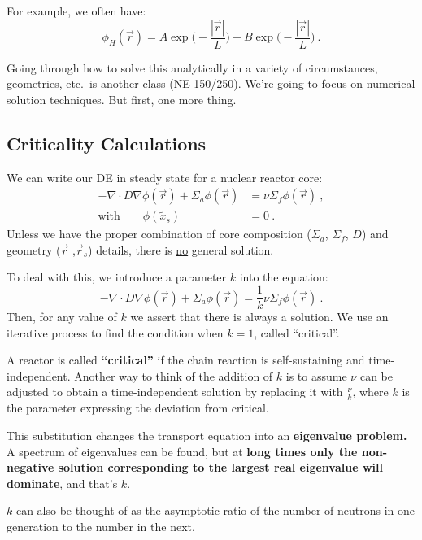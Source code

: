 \documentclass[12pt]{article}
\begin{document}
For example, we often have:
\[\phi_H(\vec{r}) = A\exp\bigl(-\frac{|\vec{r}|}{L}\bigr) + B\exp\bigl(-\frac{|\vec{r}|}{L}\bigr) \:.\]

Going through how to solve this analytically in a variety of circumstances, geometries, etc.\ is another class (NE 150/250). We're going to focus on numerical solution techniques. But first, one more thing.

\subsection*{Criticality Calculations}

We can write our DE in steady state for a nuclear reactor core:
%
\begin{align*}
-\nabla \cdot D\nabla \phi(\vec{r}) + 
\Sigma_a \phi(\vec{r}) &= \nu \Sigma_f \phi(\vec{r})\:, \\
\text{with} \qquad \phi(\tilde{x}_s) &= 0\:.
\end{align*}
%
Unless we have the proper combination of core composition ($\Sigma_a$, $\Sigma_f$, $D$) and geometry ($\vec{r}$ ,$\vec{r}_s$) details, there is \underline{no} general solution. 

To deal with this, we introduce a parameter $k$ into the equation:
%
\begin{equation}
-\nabla \cdot D\nabla \phi(\vec{r}) + 
\Sigma_a \phi(\vec{r}) = \frac{1}{k}\nu \Sigma_f \phi(\vec{r})\:. \nonumber
\end{equation}
%
Then, for any value of $k$ we assert that there is always a solution. We use an iterative process to find the condition when $k=1$, called ``critical''.

A reactor is called \textbf{``critical''} if the chain reaction is self-sustaining and time-independent. Another way to think of the addition of $k$ is to assume $\nu$ can be adjusted to obtain a time-independent solution by replacing it with $\frac{\nu}{k}$, where $k$ is the parameter expressing the deviation from critical. 

This substitution changes the transport equation into an \textbf{eigenvalue problem.} A spectrum of eigenvalues can be found, but at \textbf{long times only the non-negative solution corresponding to the largest real eigenvalue will dominate}, and that's $k$. 

$k$ can also be thought of as the asymptotic ratio of the number of neutrons in one generation to the number in the next.


 
\end{document}
